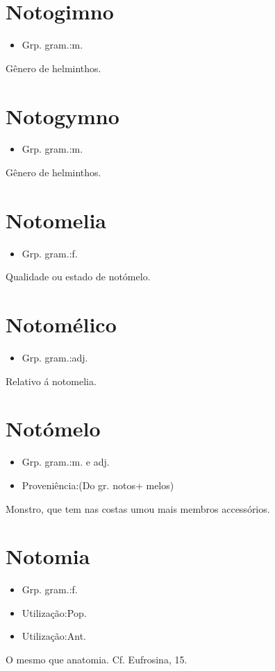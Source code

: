 \section{Notogimno}
\begin{itemize}
\item {Grp. gram.:m.}
\end{itemize}
Gênero de helminthos.
\section{Notogymno}
\begin{itemize}
\item {Grp. gram.:m.}
\end{itemize}
Gênero de helminthos.
\section{Notomelia}
\begin{itemize}
\item {Grp. gram.:f.}
\end{itemize}
Qualidade ou estado de notómelo.
\section{Notomélico}
\begin{itemize}
\item {Grp. gram.:adj.}
\end{itemize}
Relativo á notomelia.
\section{Notómelo}
\begin{itemize}
\item {Grp. gram.:m.  e  adj.}
\end{itemize}
\begin{itemize}
\item {Proveniência:(Do gr. \textunderscore notos\textunderscore  + \textunderscore melos\textunderscore )}
\end{itemize}
Monstro, que tem nas costas \textunderscore um\textunderscore  ou mais membros accessórios.
\section{Notomia}
\begin{itemize}
\item {Grp. gram.:f.}
\end{itemize}
\begin{itemize}
\item {Utilização:Pop.}
\end{itemize}
\begin{itemize}
\item {Utilização:Ant.}
\end{itemize}
O mesmo que \textunderscore anatomia\textunderscore . Cf. \textunderscore Eufrosina\textunderscore , 15.
